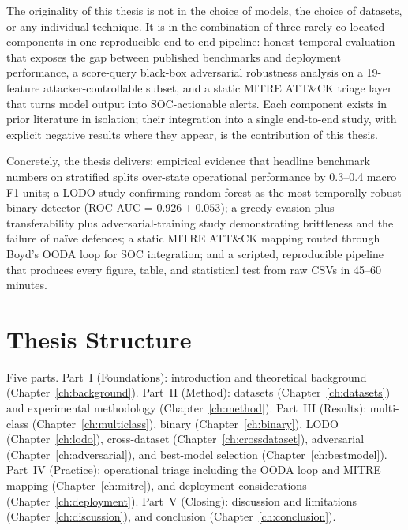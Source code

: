 The originality of this thesis is not in the choice of models, the choice
of datasets, or any individual technique. It is in the combination of
three rarely-co-located components in one reproducible end-to-end
pipeline: honest temporal evaluation that exposes the gap between
published benchmarks and deployment performance, a score-query black-box
adversarial robustness analysis on a 19-feature attacker-controllable
subset, and a static MITRE ATT\&CK triage layer that turns model output
into SOC-actionable alerts. Each component exists in prior literature in
isolation; their integration into a single end-to-end study, with
explicit negative results where they appear, is the contribution of this
thesis.

Concretely, the thesis delivers: empirical evidence that headline
benchmark numbers on stratified splits over-state operational
performance by 0.3--0.4 macro F1 units; a LODO study confirming random
forest as the most temporally robust binary detector (ROC-AUC = $0.926
\pm 0.053$); a greedy evasion plus transferability plus
adversarial-training study demonstrating brittleness and the failure of
naïve defences; a static MITRE ATT\&CK mapping routed through Boyd's
OODA loop for SOC integration; and a scripted, reproducible pipeline
that produces every figure, table, and statistical test from raw CSVs
in 45--60 minutes.

\section{Thesis Structure}

Five parts. Part~I (Foundations): introduction and theoretical
background (Chapter~\ref{ch:background}). Part~II (Method): datasets
(Chapter~\ref{ch:datasets}) and experimental methodology
(Chapter~\ref{ch:method}). Part~III (Results): multi-class
(Chapter~\ref{ch:multiclass}), binary (Chapter~\ref{ch:binary}), LODO
(Chapter~\ref{ch:lodo}), cross-dataset (Chapter~\ref{ch:crossdataset}),
adversarial (Chapter~\ref{ch:adversarial}), and best-model selection
(Chapter~\ref{ch:bestmodel}). Part~IV (Practice): operational triage
including the OODA loop and MITRE mapping (Chapter~\ref{ch:mitre}),
and deployment considerations (Chapter~\ref{ch:deployment}). Part~V
(Closing): discussion and limitations (Chapter~\ref{ch:discussion}),
and conclusion (Chapter~\ref{ch:conclusion}).
